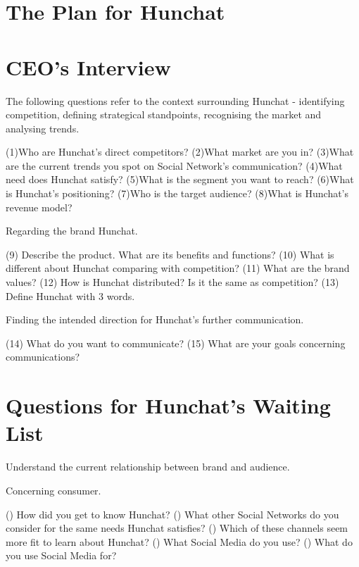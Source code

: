 \documentclass[11pt]{article}
\begin{document}
	
\section{The Plan for Hunchat}
\cleardoublepage
\newpage	

\printbibliography
\cleardoublepage

\appendix

\section{CEO's Interview} \label{ceo}

The following questions refer to the context surrounding Hunchat - identifying competition, defining strategical standpoints, recognising the market and analysing trends. \par
(1)Who are Hunchat's direct competitors?
(2)What market are you in?
(3)What are the current trends you spot on Social Network's communication?
(4)What need does Hunchat satisfy?
(5)What is the segment you want to reach?
(6)What is Hunchat's positioning?
(7)Who is the target audience?
(8)What is Hunchat's revenue model?

Regarding the brand Hunchat. \par
(9) Describe the product. What are its benefits and functions?
(10) What is different about Hunchat comparing with competition?
(11) What are the brand values?
(12) How is Hunchat distributed? Is it the same as competition?
(13) Define Hunchat with 3 words.

Finding the intended direction for Hunchat's further communication. \par
(14) What do you want to communicate?
(15) What are your goals concerning communications?

\section{Questions for Hunchat's Waiting List}\label{qwait}

Understand the current relationship between brand and audience.\par
Concerning consumer. \par
() How did you get to know Hunchat?
() What other Social Networks do you consider for the same needs Hunchat satisfies?
() Which of these channels seem more fit to learn about Hunchat?
() What Social Media do you use?
() What do you use Social Media for?
\end{document}
